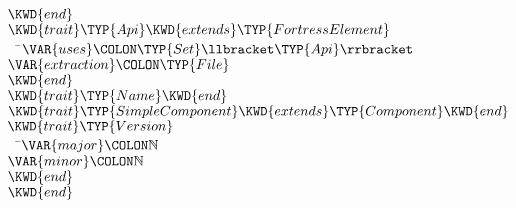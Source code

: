 \begin{Fortress}
\(\KWD{end}\)\\[4pt]
\(\KWD{trait} \TYP{Api} \KWD{extends} \TYP{FortressElement}\)\\
{\tt~~}\pushtabs\=\+\(  \VAR{uses}\COLON \TYP{Set}\llbracket\TYP{Api}\rrbracket\)\\
\(  \VAR{extraction}\COLON \TYP{File}\)\-\\\poptabs
\(\KWD{end}\)\\[4pt]
\(\KWD{trait} \TYP{Name} \KWD{end}\)\\[4pt]
\(\KWD{trait} \TYP{SimpleComponent} \KWD{extends} \TYP{Component} \KWD{end}\)\\[4pt]
\(\KWD{trait} \TYP{Version}\)\\
{\tt~~}\pushtabs\=\+\(  \VAR{major}\COLON \mathbb{N}\)\\
\(  \VAR{minor}\COLON \mathbb{N}\)\-\\\poptabs
\(\KWD{end}\)\\[4pt]
\(\KWD{end}\)
\end{Fortress}

